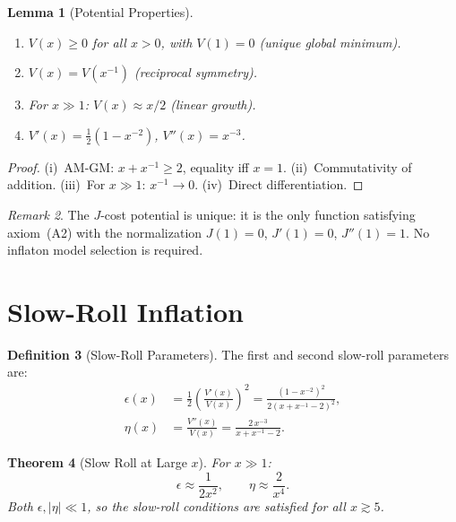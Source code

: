 \documentclass[12pt,a4paper]{article}
\newtheorem{theorem}{Theorem}[section]
\newtheorem{lemma}[theorem]{Lemma}
\theoremstyle{definition}
\newtheorem{definition}[theorem]{Definition}
\theoremstyle{remark}
\newtheorem{remark}[theorem]{Remark}
\begin{document}
\begin{lemma}[Potential Properties]
\label{lem:properties}
\begin{enumerate}[label=(\roman*),nosep]
  \item $V(x) \geq 0$ for all $x > 0$, with
  $V(1) = 0$ (unique global minimum).
  \item $V(x) = V(x^{-1})$ (reciprocal symmetry).
  \item For $x \gg 1$: $V(x) \approx x/2$ (linear growth).
  \item $V'(x) = \tfrac{1}{2}(1 - x^{-2})$,
  $V''(x) = x^{-3}$.
\end{enumerate}
\end{lemma}

\begin{proof}
(i)~AM-GM: $x + x^{-1} \geq 2$, equality iff $x = 1$.
(ii)~Commutativity of addition.
(iii)~For $x \gg 1$: $x^{-1} \to 0$.
(iv)~Direct differentiation.
\end{proof}

\begin{remark}
The $J$-cost potential is unique: it is the only function
satisfying axiom~(A2) with the normalization
$J(1) = 0$, $J'(1) = 0$, $J''(1) = 1$.  No inflaton model
selection is required.
\end{remark}

\section{Slow-Roll Inflation}
\label{sec:slowroll}

\begin{definition}[Slow-Roll Parameters]
The first and second slow-roll parameters are:
\begin{align}
  \epsilon(x) &= \frac{1}{2}
  \left(\frac{V'(x)}{V(x)}\right)^2
  = \frac{(1 - x^{-2})^2}{2(x + x^{-1} - 2)^2},
  \label{eq:epsilon} \\
  \eta(x) &= \frac{V''(x)}{V(x)}
  = \frac{2\,x^{-3}}{x + x^{-1} - 2}.
  \label{eq:eta}
\end{align}
\end{definition}

\begin{theorem}[Slow Roll at Large $x$]
\label{thm:slowroll}
For $x \gg 1$:
\begin{equation}
  \epsilon \approx \frac{1}{2x^2}, \qquad
  \eta \approx \frac{2}{x^4}.
\end{equation}
Both $\epsilon, |\eta| \ll 1$, so the slow-roll conditions
are satisfied for all $x \gtrsim 5$.
\end{theorem}
\end{document}

